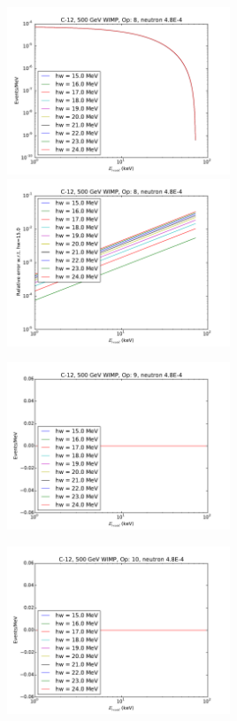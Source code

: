 \documentclass{article}
\begin{document}
\includegraphics[width=0.5\textwidth]{c12-hw-o8}
\includegraphics[width=0.5\textwidth]{c12-hw-o8-relerr}

\includegraphics[width=0.5\textwidth]{c12-hw-o9}

\includegraphics[width=0.5\textwidth]{c12-hw-o10}
\end{document}
